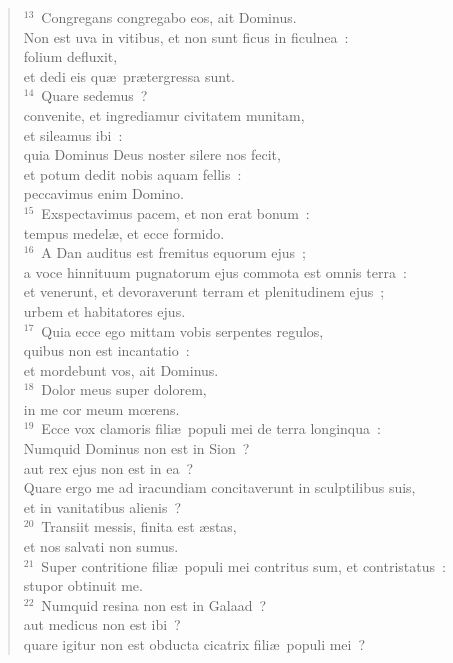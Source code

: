 \begin{verse}
${}^{13}$~Congregans congregabo eos, ait Dominus.\\ Non est uva in vitibus, et non sunt ficus in ficulnea~:\\ folium defluxit,\\ et dedi eis qu\ae\ pr\ae tergressa sunt.\\
${}^{14}$~Quare sedemus~?\\ convenite, et ingrediamur civitatem munitam,\\ et sileamus ibi~:\\ quia Dominus Deus noster silere nos fecit,\\ et potum dedit nobis aquam fellis~:\\ peccavimus enim Domino.\\
${}^{15}$~Exspectavimus pacem, et non erat bonum~:\\ tempus medel\ae , et ecce formido.\\
${}^{16}$~A Dan auditus est fremitus equorum ejus~;\\ a voce hinnituum pugnatorum ejus commota est omnis terra~:\\ et venerunt, et devoraverunt terram et plenitudinem ejus~;\\ urbem et habitatores ejus.\\
${}^{17}$~Quia ecce ego mittam vobis serpentes regulos,\\ quibus non est incantatio~:\\ et mordebunt vos, ait Dominus.\\
${}^{18}$~Dolor meus super dolorem,\\ in me cor meum mœrens.\\
${}^{19}$~Ecce vox clamoris fili\ae\ populi mei de terra longinqua~:\\ Numquid Dominus non est in Sion~?\\ aut rex ejus non est in ea~?\\ Quare ergo me ad iracundiam concitaverunt in sculptilibus suis,\\ et in vanitatibus alienis~?\\
${}^{20}$~Transiit messis, finita est \ae stas,\\ et nos salvati non sumus.\\
${}^{21}$~Super contritione fili\ae\ populi mei contritus sum, et contristatus~:\\ stupor obtinuit me.\\
${}^{22}$~Numquid resina non est in Galaad~?\\ aut medicus non est ibi~?\\ quare igitur non est obducta cicatrix fili\ae\ populi mei~?\end{verse}



